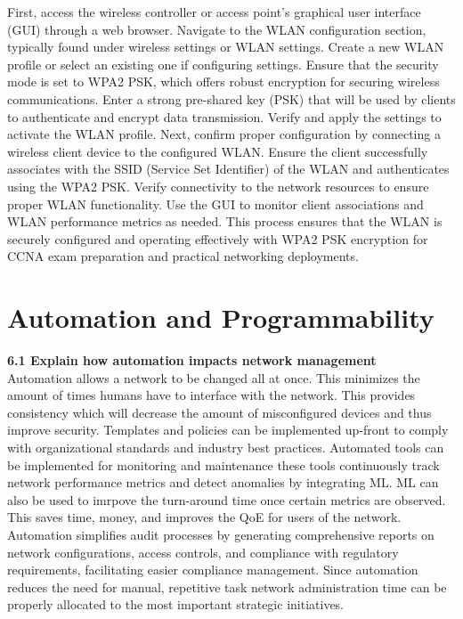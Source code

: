 \documentclass{article}
\begin{document}
	First, access the wireless controller or access point's graphical user interface (GUI) through a web browser. Navigate to the WLAN configuration section, typically found under wireless settings or WLAN settings. Create a new WLAN profile or select an existing one if configuring settings. Ensure that the security mode is set to WPA2 PSK, which offers robust encryption for securing wireless communications. Enter a strong pre-shared key (PSK) that will be used by clients to authenticate and encrypt data transmission. Verify and apply the settings to activate the WLAN profile. Next, confirm proper configuration by connecting a wireless client device to the configured WLAN. Ensure the client successfully associates with the SSID (Service Set Identifier) of the WLAN and authenticates using the WPA2 PSK. Verify connectivity to the network resources to ensure proper WLAN functionality. Use the GUI to monitor client associations and WLAN performance metrics as needed. This process ensures that the WLAN is securely configured and operating effectively with WPA2 PSK encryption for CCNA exam preparation and practical networking deployments.

\section{Automation and Programmability}
\noindent\textbf{6.1 Explain how automation impacts network management}\\

	Automation allows a network to be changed all at once. This minimizes the amount of times humans have to interface with the network. This provides consistency which will decrease the amount of misconfigured devices and thus improve security. Templates and policies can be implemented up-front to comply with organizational standards and industry best practices. Automated tools can be implemented for monitoring and maintenance these tools continuously track network performance metrics and detect anomalies by integrating ML. ML can also be used to imrpove the turn-around time once certain metrics are observed. This saves time, money, and improves the QoE for users of the network. Automation simplifies audit processes by generating comprehensive reports on network configurations, access controls, and compliance with regulatory requirements, facilitating easier compliance management. Since automation reduces the need for manual, repetitive task network administration time can be properly allocated to the most important strategic initiatives.\\
  	  
\end{document}
